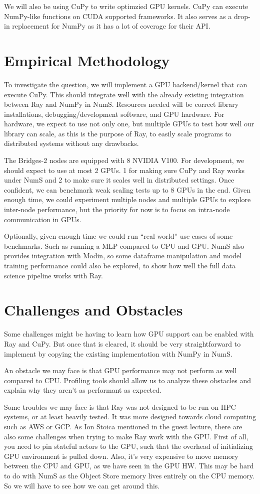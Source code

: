 \documentclass{article}
\begin{document}
We will also be using CuPy to write optimzied GPU kernels. CuPy can execute NumPy-like functions on CUDA supported frameworks. It also serves as a drop-in replacement for NumPy as it has a lot of coverage for their API. \cite{cupy_learningsys2017}

\section{Empirical Methodology}
To investigate the question, we will implement a GPU backend/kernel that can execute CuPy. This should integrate well with the already existing integration between Ray and NumPy in NumS. Resources needed will be correct library installations, debugging/development software, and GPU hardware. For hardware, we expect to use not only one, but multiple GPUs to test how well our library can scale, as this is the purpose of Ray, to easily scale programs to distributed systems without any drawbacks.

The Bridges-2 nodes are equipped with 8 NVIDIA V100. For development, we should expect to use at most 2 GPUs. 1 for making sure CuPy and Ray works under NumS and 2 to make sure it scales well in distributed settings. Once confident, we can benchmark weak scaling tests up to 8 GPUs in the end. Given enough time, we could experiment multiple nodes and multiple GPUs to explore inter-node performance, but the priority for now is to focus on intra-node communication in GPUs.

Optionally, given enough time we could run “real world” use cases of some benchmarks. Such as running a MLP compared to CPU and GPU. NumS also provides integration with Modin, so some dataframe manipulation and model training performance could also be explored, to show how well the full data science pipeline works with Ray.

\section{Challenges and Obstacles}
Some challenges might be having to learn how GPU support can be enabled with Ray and CuPy. But once that is cleared, it should be very straightforward to implement by copying the existing implementation with NumPy in NumS.

An obstacle we may face is that GPU performance may not perform as well compared to CPU. Profiling tools should allow us to analyze these obstacles and explain why they aren’t as performant as expected.

Some troubles we may face is that Ray was not designed to be run on HPC systems, or at least heavily tested. It was more designed towards cloud computing such as AWS or GCP. As Ion Stoica mentioned in the guest lecture, there are also some challenges when trying to make Ray work with the GPU. First of all, you need to pin stateful actors to the GPU, such that the overhead of initializing GPU environment is pulled down. \cite{Ray} Also, it's very expensive to move memory between the CPU and GPU, as we have seen in the GPU HW. This may be hard to do with NumS as the Object Store memory lives entirely on the CPU memory. So we will have to see how we can get around this.



\end{document}
